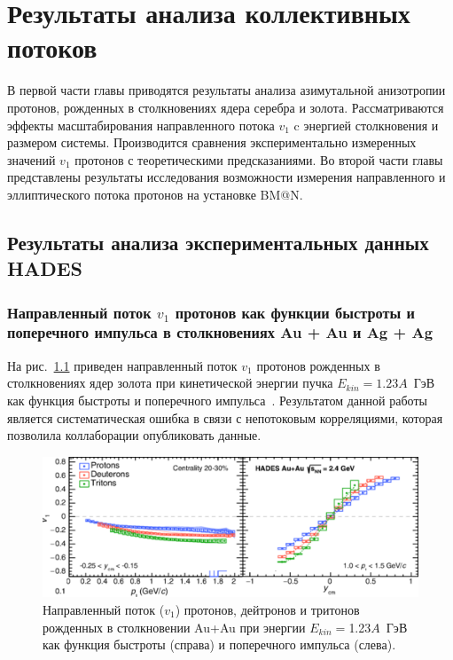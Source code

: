 \chapter{Результаты анализа коллективных потоков}

В первой части главы приводятся результаты анализа азимутальной анизотропии протонов, рожденных в столкновениях ядера серебра и золота.
Рассматриваются эффекты масштабирования направленного потока $v_1$ c энергией столкновения и размером системы.
Производится сравнения экспериментально измеренных значений $v_1$ протонов с теоретическими предсказаниями.
Во второй части главы представлены результаты исследования возможности измерения направленного и эллиптического потока протонов на установке BM@N.   

\section{Результаты анализа экспериментальных данных HADES}

\subsection{Направленный поток $v_1$ протонов как функции быстроты и поперечного импульса в столкновениях Au + Au и Ag + Ag}

На рис.~\ref{fig:hades_prl} приведен направленный поток $v_1$ протонов рожденных в столкновениях ядер золота при кинетической энергии пучка $E_{kin}=1.23A$~ГэВ как функция быстроты и поперечного импульса~\cite{HADES:2020lob}.
Результатом данной работы является систематическая ошибка в связи с непотоковым корреляциями, которая позволила коллаборации опубликовать данные.
%
\begin{figure}[ht]
\begin{center}
\includegraphics[width=0.75\linewidth]{images/HADES_prl.png}
\caption{Направленный поток ($v_1$) протонов, дейтронов и тритонов  рожденных в столкновении Au+Au при энергии $E_{kin}=$1.23$A$~ГэВ как функция быстроты (справа) и поперечного импульса (слева).}
\label{fig:hades_prl}
\end{center}
\end{figure}

